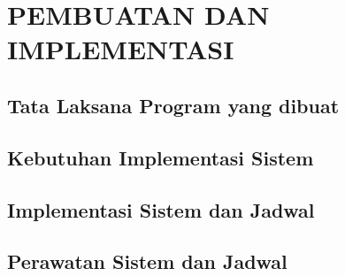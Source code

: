 \chapter{\vspace{2ex}PEMBUATAN DAN IMPLEMENTASI}

\section{Tata Laksana Program yang dibuat}


\section{Kebutuhan Implementasi Sistem}


\section{Implementasi Sistem dan Jadwal}


\section{Perawatan Sistem dan Jadwal}

